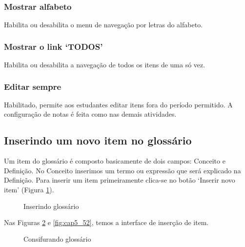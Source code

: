 \subsubsection{Mostrar alfabeto}
 Habilita ou desabilita o menu de navegação por letras do alfabeto.
\subsubsection{Mostrar o link ‘TODOS’}
Habilita ou desabilita a navegação de todos os itens de uma só vez.
\subsubsection{Editar sempre}
Habilitado, permite aos estudantes editar itens  fora do período permitido.
A configuração de notas é feita como nas demais atividades.
\subsection{Inserindo um novo item no glossário}
Um item do glossário é composto basicamente de dois campos: Conceito e Definição. No Conceito inserimos um termo ou expressão que será explicado na Definição. Para inserir um item primeiramente clica-se no botão ‘Inserir novo item’ (Figura \ref{fig:cap5_50}).
\begin{figure}[htbp]
 \begin{center}
  \caption{Inserindo glossário}
  \label{fig:cap5_50}
 \end{center}
\end{figure}
Nas Figuras \ref{fig:cap5_51} e \ref{fig:cap5_52}, temos a interface de inserção de item.
\begin{figure}[htbp]
 \begin{center}
  \caption{Consifurando glossário}
  \label{fig:cap5_51}
 \end{center}
\end{figure}

